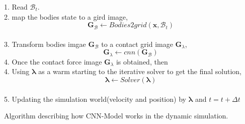 \begin{algorithm}[!ht]
        {
            1. Read $\mathcal{B}_t$. \\
            2. map the bodies state to a gird image,
                $$\pmb{G}_{\mathcal{B}} \gets Bodies2grid(\mathbf{x}, \mathcal{B}_t)$$ \\
            3. Transform bodies imgae $\pmb{G}_{\mathcal{B}}$ to a contact grid image $\pmb{G}_{\lambda}$,
            $$\pmb{G}_{\lambda} \gets cnn(\pmb{G}_{\mathcal{B}})$$
            4. Once the contact force image $\pmb{G}_{\lambda}$ is obtained,  then \\
            4. Using $\pmb{\lambda}$ as a warm starting to the iterative solver to get the final solution,
            $$\pmb{\lambda} \gets Solver(\pmb{\lambda})$$ \\
            5. Updating the simulation world(velocity and position) by $\pmb{\lambda}$ and $t = t+\Delta t$
        }
        \caption{Algorithm describing how CNN-Model works in the dynamic simulation.}
        \label{al:basic}
\end{algorithm}
